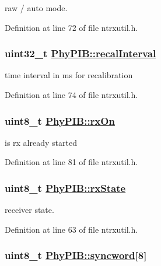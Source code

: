 raw / auto mode. 

Definition at line 72 of file ntrxutil.h.\hypertarget{structPhyPIB_3130a146ce313790b7fa309e9bb22f81}{
\subsubsection[recalInterval]{\setlength{\rightskip}{0pt plus 5cm}uint32\_\-t \hyperlink{structPhyPIB_3130a146ce313790b7fa309e9bb22f81}{Phy\-PIB::recal\-Interval}}}
\label{structPhyPIB_3130a146ce313790b7fa309e9bb22f81}


time interval in ms for recalibration 

Definition at line 74 of file ntrxutil.h.\hypertarget{structPhyPIB_33eae89abb0e1cd8c71db6b89bd97b81}{
\subsubsection[rxOn]{\setlength{\rightskip}{0pt plus 5cm}uint8\_\-t \hyperlink{structPhyPIB_33eae89abb0e1cd8c71db6b89bd97b81}{Phy\-PIB::rx\-On}}}
\label{structPhyPIB_33eae89abb0e1cd8c71db6b89bd97b81}


is rx already started 

Definition at line 81 of file ntrxutil.h.\hypertarget{structPhyPIB_5e268f5bfad168fc2a870cb622c66438}{
\subsubsection[rxState]{\setlength{\rightskip}{0pt plus 5cm}uint8\_\-t \hyperlink{structPhyPIB_5e268f5bfad168fc2a870cb622c66438}{Phy\-PIB::rx\-State}}}
\label{structPhyPIB_5e268f5bfad168fc2a870cb622c66438}


receiver state. 

Definition at line 63 of file ntrxutil.h.\hypertarget{structPhyPIB_3da678ca37d438cfe50f72de04372b49}{
\subsubsection[syncword]{\setlength{\rightskip}{0pt plus 5cm}uint8\_\-t \hyperlink{structPhyPIB_3da678ca37d438cfe50f72de04372b49}{Phy\-PIB::syncword}\mbox{[}8\mbox{]}}}
\label{structPhyPIB_3da678ca37d438cfe50f72de04372b49}


